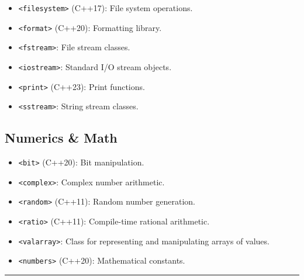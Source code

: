 \begin{itemize}
\tightlist
\item
  \passthrough{\lstinline!<filesystem>!} (C++17): File system
  operations.
\item
  \passthrough{\lstinline!<format>!} (C++20): Formatting library.
\item
  \passthrough{\lstinline!<fstream>!}: File stream classes.
\item
  \passthrough{\lstinline!<iostream>!}: Standard I/O stream objects.
\item
  \passthrough{\lstinline!<print>!} (C++23): Print functions.
\item
  \passthrough{\lstinline!<sstream>!}: String stream classes.
\end{itemize}

\hypertarget{numerics-math}{%
\subsection{Numerics \& Math}\label{numerics-math}}

\begin{itemize}
\tightlist
\item
  \passthrough{\lstinline!<bit>!} (C++20): Bit manipulation.
\item
  \passthrough{\lstinline!<complex>!}: Complex number arithmetic.
\item
  \passthrough{\lstinline!<random>!} (C++11): Random number generation.
\item
  \passthrough{\lstinline!<ratio>!} (C++11): Compile-time rational
  arithmetic.
\item
  \passthrough{\lstinline!<valarray>!}: Class for representing and
  manipulating arrays of values.
\item
  \passthrough{\lstinline!<numbers>!} (C++20): Mathematical constants.
\end{itemize}

\begin{center}\rule{0.5\linewidth}{0.5pt}\end{center}
